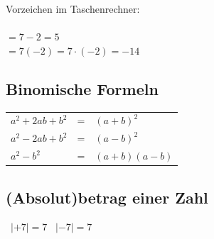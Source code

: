 \begin{multicols}{2}

Vorzeichen im Taschenrechner:\\
\vspace{3mm}\\
$=7-2= 5$\\
$=7(-2)=7\cdot{}(-2)= -14$








\subsection*{Binomische Formeln}
\begin{tabular}{lcl}
  $a^2 + 2ab + b^2$  & =  &  $(a+b)^2$\\
  $a^2 - 2ab + b^2$  & =  &  $(a-b)^2$\\
  $a^2 - b^2$        & =  &  $(a+b)(a-b)$
\end{tabular} 


\subsection*{(Absolut)betrag einer Zahl}%
\hfill\, $|+7| = 7$ \hfill\, $|-7| = 7$ \hfill\, %


\end{multicols}
